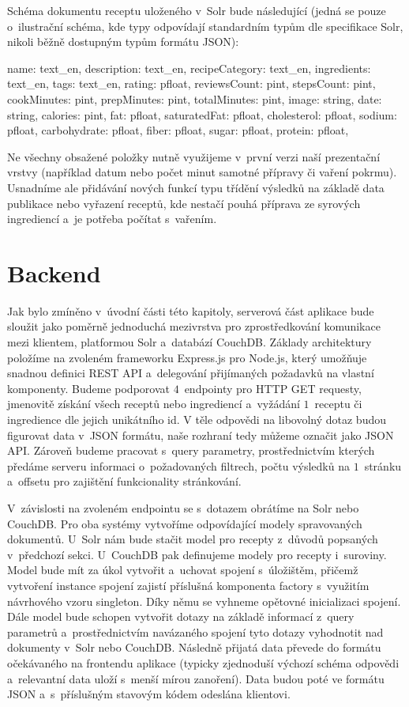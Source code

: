 Schéma dokumentu receptu uloženého v~Solr bude následující (jedná se pouze o~ilustrační schéma, kde typy odpovídají standardním typům dle specifikace Solr, nikoli běžně dostupným typům formátu JSON):

\begin{code}
{
    name: text_en,
    description: text_en,
    recipeCategory: text_en,
    ingredients: text_en,
    tags: text_en,
    rating: pfloat,
    reviewsCount: pint,
    stepsCount: pint,
    cookMinutes: pint,
    prepMinutes: pint,
    totalMinutes: pint,
    image: string,
    date: string,
    calories: pint,
    fat: pfloat,
    saturatedFat: pfloat,
    cholesterol: pfloat,
    sodium: pfloat,
    carbohydrate: pfloat,
    fiber: pfloat,
    sugar: pfloat,
    protein: pfloat,
}
\end{code}

Ne všechny obsažené položky nutně využijeme v~první verzi naší prezentační vrstvy (například datum nebo počet minut samotné přípravy či vaření pokrmu). Usnadníme ale přidávání nových funkcí typu třídění výsledků na základě data publikace nebo vyřazení receptů, kde nestačí pouhá příprava ze syrových ingrediencí a~je potřeba počítat s~vařením.

\section{Backend}

Jak bylo zmíněno v~úvodní části této kapitoly, serverová část aplikace bude sloužit jako poměrně jednoduchá mezivrstva pro zprostředkování komunikace mezi klientem, platformou Solr a~databází CouchDB. Základy architektury položíme na zvoleném frameworku Express.js pro Node.js, který umožňuje snadnou definici REST API a~delegování přijímaných požadavků na vlastní komponenty. Budeme podporovat $4$~endpointy pro HTTP GET requesty, jmenovitě získání všech receptů nebo ingrediencí a~vyžádání $1$~receptu či ingredience dle jejich unikátního id. V těle odpovědi na libovolný dotaz budou figurovat data v~JSON formátu, naše rozhraní tedy můžeme označit jako JSON API. Zároveň budeme pracovat s~query parametry, prostřednictvím kterých předáme serveru informaci o~požadovaných filtrech, počtu výsledků na $1$~stránku a~offsetu pro zajištění funkcionality stránkování.

V~závislosti na zvoleném endpointu se s~dotazem obrátíme na Solr nebo CouchDB. Pro oba systémy vytvoříme odpovídající modely spravovaných dokumentů. U~Solr nám bude stačit model pro recepty z~důvodů popsaných v~předchozí sekci. U~CouchDB pak definujeme modely pro recepty i~suroviny. Model bude mít za úkol vytvořit a~uchovat spojení s~úložištěm, přičemž vytvoření instance spojení zajistí příslušná komponenta factory s~využitím návrhového vzoru singleton. Díky němu se vyhneme opětovné inicializaci spojení. Dále model bude schopen vytvořit dotazy na základě informací z~query parametrů a~prostřednictvím navázaného spojení tyto dotazy vyhodnotit nad dokumenty v~Solr nebo CouchDB. Následně přijatá data převede do formátu očekávaného na frontendu aplikace (typicky zjednoduší výchozí schéma odpovědi a~relevantní data uloží s~menší mírou zanoření). Data budou poté ve formátu JSON a~s~příslušným stavovým kódem odeslána klientovi. 

